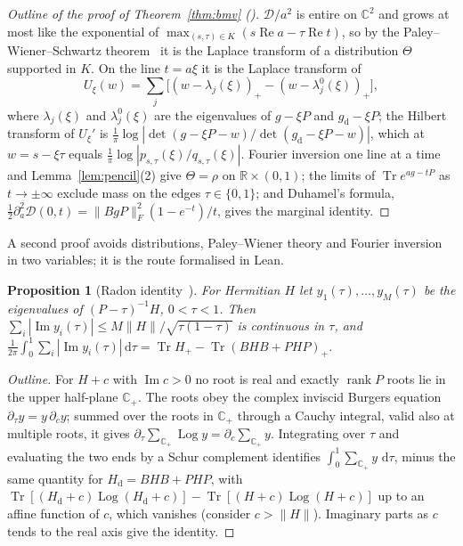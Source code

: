 \documentclass[11pt]{article}
\newtheorem{proposition}[lemma]{Proposition}
\theoremstyle{remark}
\numberwithin{equation}{section}
\newcommand{\R}{\mathbb{R}}
\newcommand{\C}{\mathbb{C}}
\newcommand{\Tr}{\operatorname{Tr}}
\renewcommand{\Re}{\operatorname{Re}}
\renewcommand{\Im}{\operatorname{Im}}
\newcommand{\cD}{\mathcal{D}}
\newcommand{\dd}{\,\mathrm{d}}
\begin{document}
\begin{proof}[Outline of the proof of Theorem~\ref{thm:bmv} \textup{(\cite[Section~3.5]{MSmath})}]
$\cD/a^2$ is entire on $\C^2$ and grows at most like the exponential of
$\max_{(s,\tau)\in K}(s\Re a-\tau\Re t)$, so by the Paley--Wiener--Schwartz theorem~\cite[Theorem~7.3.1]{Hormander} it is
the Laplace transform of a distribution $\Theta$ supported in $K$. On the line $t=a\xi$ it is the Laplace transform of
\[
U_\xi(w)=\sum_j\bigl[(w-\lambda_j(\xi))_+-(w-\lambda^0_j(\xi))_+\bigr],
\]
where $\lambda_j(\xi)$ and $\lambda^0_j(\xi)$ are the eigenvalues of $g-\xi P$ and $g_{\mathrm d}-\xi P$; the Hilbert
transform of $U_\xi'$ is $\frac1\pi\log|\det(g-\xi P-w)/\det(g_{\mathrm d}-\xi P-w)|$, which at $w=s-\xi\tau$ equals
$\frac1\pi\log|p_{s,\tau}(\xi)/q_{s,\tau}(\xi)|$. Fourier inversion one line at a time and Lemma~\ref{lem:pencil}(2) give
$\Theta=\rho$ on $\R\times(0,1)$; the limits of $\Tr e^{ag-tP}$ as $t\to\pm\infty$ exclude mass on the edges
$\tau\in\{0,1\}$; and Duhamel's formula, $\frac12\partial_a^2\cD(0,t)=\|BgP\|_F^2(1-e^{-t})/t$, gives the marginal
identity.
\end{proof}

A second proof avoids distributions, Paley--Wiener theory and Fourier inversion in two variables; it is the route
formalised in Lean.

\begin{proposition}[Radon identity~{\cite[Theorem~B.1]{MSmath}}]\label{prop:radon}
For Hermitian $H$ let $y_1(\tau),\dots,y_M(\tau)$ be the eigenvalues of $(P-\tau)^{-1}H$, $0<\tau<1$. Then
$\sum_i|\Im y_i(\tau)|\le M\|H\|/\sqrt{\tau(1-\tau)}$ is continuous in $\tau$, and
$\frac1{2\pi}\int_0^1\sum_i|\Im y_i(\tau)|\dd\tau=\Tr H_+-\Tr(BHB+PHP)_+$.
\end{proposition}

\begin{proof}[Outline]
For $H+c$ with $\Im c>0$ no root is real and exactly $\operatorname{rank}P$ roots lie in the upper half-plane $\C_+$. The
roots obey the complex inviscid Burgers equation $\partial_\tau y=y\,\partial_cy$; summed over the roots in $\C_+$
through a Cauchy integral, valid also at multiple roots, it gives
$\partial_\tau\sum_{\C_+}\operatorname{Log}y=\partial_c\sum_{\C_+}y$. Integrating over $\tau$ and evaluating the two ends
by a Schur complement identifies $\int_0^1\sum_{\C_+}y\,\dd\tau$, minus the same quantity for $H_{\mathrm d}=BHB+PHP$,
with $\Tr[(H_{\mathrm d}+c)\operatorname{Log}(H_{\mathrm d}+c)]-\Tr[(H+c)\operatorname{Log}(H+c)]$ up to an affine
function of $c$, which vanishes (consider $c>\|H\|$). Imaginary parts as $c$ tends to the real axis give the identity.
\end{proof}
\end{document}
